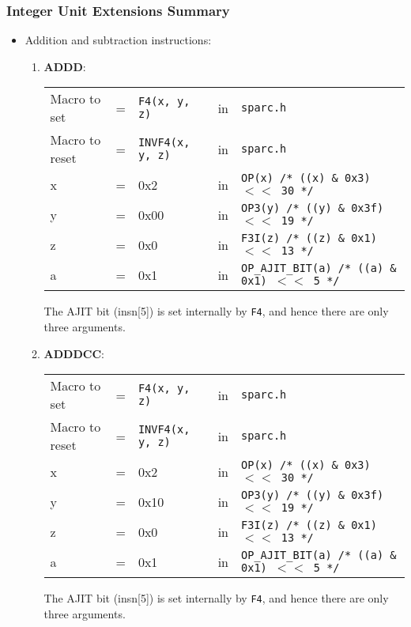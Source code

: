 \subsubsection{Integer Unit Extensions Summary}
\label{sec:int:unit:extns:summary}

\begin{itemize}
\item {Addition and subtraction instructions:}\\
  \begin{enumerate}
  \item \textbf{ADDD}:\\
    \begin{tabular}[h]{lclcl}
      Macro to set  &=& \texttt{F4(x, y, z)} &in& \texttt{sparc.h}     \\
      Macro to reset  &=& \texttt{INVF4(x, y, z)} &in& \texttt{sparc.h}     \\
      x &=& 0x2      &in& \texttt{OP(x)  /* ((x) \& 0x3)  $<<$ 30 */} \\
      y &=& 0x00     &in& \texttt{OP3(y) /* ((y) \& 0x3f) $<<$ 19 */} \\
      z &=& 0x0      &in& \texttt{F3I(z) /* ((z) \& 0x1)  $<<$ 13 */} \\
      a &=& 0x1      &in& \texttt{OP\_AJIT\_BIT(a) /* ((a) \& 0x1)  $<<$ 5 */}
    \end{tabular}

    The AJIT bit  (insn[5]) is set internally by  \texttt{F4}, and hence
    there are only three arguments.

  \item \textbf{ADDDCC}:\\
    \begin{tabular}[h]{lclcl}
      Macro to set  &=& \texttt{F4(x, y, z)} &in& \texttt{sparc.h}     \\
      Macro to reset  &=& \texttt{INVF4(x, y, z)} &in& \texttt{sparc.h}     \\
      x &=& 0x2      &in& \texttt{OP(x)  /* ((x) \& 0x3)  $<<$ 30 */} \\
      y &=& 0x10     &in& \texttt{OP3(y) /* ((y) \& 0x3f) $<<$ 19 */} \\
      z &=& 0x0      &in& \texttt{F3I(z) /* ((z) \& 0x1)  $<<$ 13 */} \\
      a &=& 0x1      &in& \texttt{OP\_AJIT\_BIT(a) /* ((a) \& 0x1)  $<<$ 5 */}
    \end{tabular}

    The AJIT bit  (insn[5]) is set internally by  \texttt{F4}, and hence
    there are only three arguments.


\end{enumerate}
\end{itemize}
